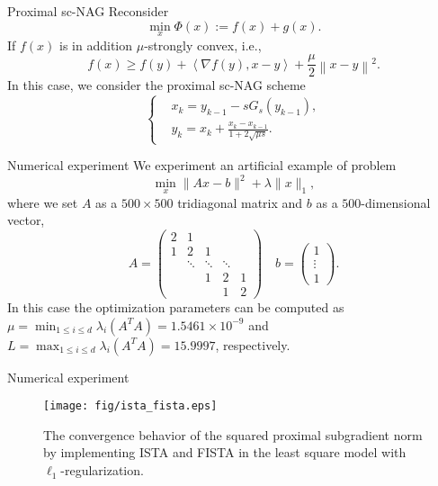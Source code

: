 \documentclass[10pt]{beamer}
\begin{document}
\begin{frame}{Proximal sc-NAG}
	Reconsider
  \begin{equation*}
    \min_x \Phi(x) := f(x) + g(x).
  \end{equation*}
  If $f(x)$ is in addition $\mu$-strongly convex, i.e., 
  \begin{equation}\label{scine}
    f(x) \ge f(y) + \left\langle \nabla f(y), x - y\right\rangle + \frac{\mu}{2}\left\| x - y\right\|^2.
  \end{equation}
  In this case, we consider the proximal sc-NAG scheme 
  \begin{equation}\label{scNAG}
    \left\{\begin{aligned}
      & x_{k} =y_{k-1} - sG_s(y_{k-1}),              \\
      & y_{k} = x_{k}  + \frac{x_{k} - x_{k-1}}{1+2\sqrt{\mu s}}.
    \end{aligned}\right.
  \end{equation}
\end{frame}

\begin{frame}{Numerical experiment}
  We experiment an artificial example of problem 
  \begin{equation*}
    \min_x \|Ax - b\|^2 + \lambda\|x\|_1,
  \end{equation*}
  where we set $A$ as a $500\times 500$ tridiagonal matrix and $b$ as a $500$-dimensional vector,
  \begin{equation*}
    A = \begin{pmatrix}
      2 & 1 &   &   &  \\
      1 & 2 & 1 &   &  \\
        & \ddots & \ddots & \ddots &  \\
        &   & 1 & 2 & 1  \\
        &   &   & 1 & 2 
    \end{pmatrix}\quad
    b = \begin{pmatrix}
      1 \\
      \vdots \\
      1 
    \end{pmatrix}.
  \end{equation*}
  In this case the optimization parameters can be computed as 
  $\mu = \min_{1\leq i \leq d}\lambda_i(A^{T}A) = 1.5461 \times 10^{-9}$ and $L=\max_{1\leq i \leq d} \lambda_i(A^{T}A) = 15.9997$, respectively.
\end{frame}

\begin{frame}{Numerical experiment}
  \begin{figure}[htpb!]
    \centering
    \texttt{[image: fig/ista\_fista.eps]}
    \caption{The convergence behavior of the squared proximal subgradient norm by implementing ISTA and FISTA in the least square model with $\ell_1$-regularization.}
    \label{fig: fista}
    \end{figure}
\end{frame}
\end{document}
